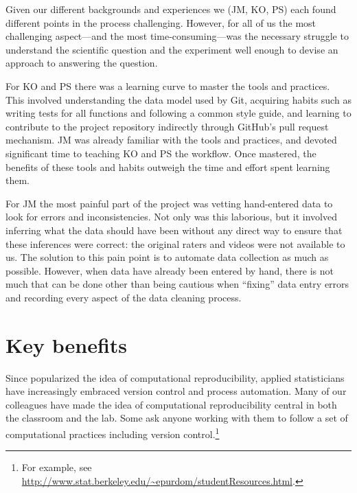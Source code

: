 \documentclass[]{article}
\begin{document}
Given our different backgrounds and experiences we (JM, KO, PS) each found
different points in the process challenging. 
However, for all of us the most challenging aspect---and the most 
time-consuming---was the necessary
struggle to understand the scientific question and the experiment
well enough to devise an approach to answering the question.

For KO and PS there was a learning curve to master the tools and practices.
This involved understanding the data model used by Git, acquiring habits such
as writing tests for all functions and following a common style guide, and
learning to contribute to the project repository indirectly through GitHub's
pull request mechanism.
JM was already familiar with the tools and practices, and devoted significant time
to teaching KO and PS the workflow.
Once mastered, the benefits of these tools and habits outweigh the time and effort
spent learning them.

For JM the most painful part of the project was vetting hand-entered data
to look for errors and inconsistencies.
Not only was this laborious, but it involved inferring what the data
should have been without any direct way to ensure that these inferences were
correct: the original raters and videos were not available to us.
The solution to this pain point is to automate data collection as
much as possible.
However, when data have already been entered by hand, there is not much that can
be done other than being cautious when ``fixing'' data entry errors and recording
every aspect of the data cleaning process.

\section{Key benefits}

Since \citet{buckheit1995wavelab} popularized the idea of computational
reproducibility, applied statisticians have increasingly embraced version control
and process automation.
Many of our colleagues have made the idea of computational reproducibility
central in both the classroom and the lab.
Some ask anyone working with them to follow a set of computational practices
including version control.\footnote{
  For example, see
  \url{http://www.stat.berkeley.edu/~epurdom/studentResources.html}.
}
\end{document}
